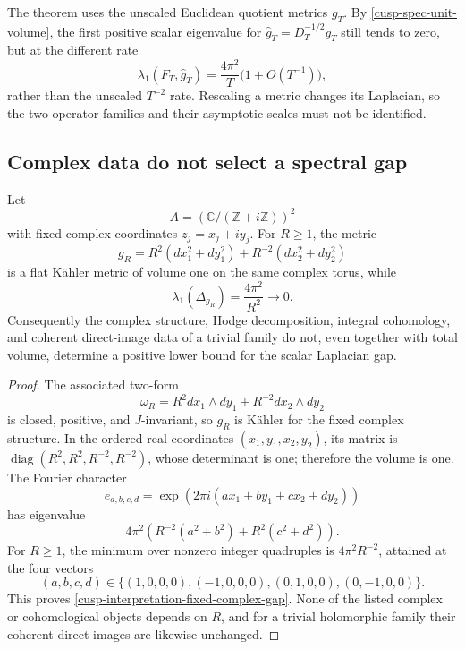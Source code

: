 \begin{remark}
The theorem uses the unscaled Euclidean quotient metrics \(g_T\).  By
\cref{cusp-spec-unit-volume}, the first positive scalar eigenvalue for
\(\widehat g_T=D_T^{-1/2}g_T\) still tends to zero, but at the different
rate
\[
 \lambda_1(F_T,\widehat g_T)
 =\frac{4\pi^2}{T}\bigl(1+O(T^{-1})\bigr),
\]
rather than the unscaled \(T^{-2}\) rate.  Rescaling a metric changes its
Laplacian, so the two operator families and their asymptotic scales must not
be identified.
\end{remark}

\subsection{Complex data do not select a spectral gap}
\label{cusp-interpretation-metric-indeterminacy-subsection}

\begin{proposition}
\label{cusp-interpretation-fixed-complex-counterexample}
Let
\[
 A=(\mathbb C/(\mathbb Z+i\mathbb Z))^2
\]
with fixed complex coordinates
\(z_j=x_j+iy_j\).  For \(R\ge1\), the metric
\begin{equation}
 g_R=R^2(dx_1^2+dy_1^2)+R^{-2}(dx_2^2+dy_2^2)
 \label{cusp-interpretation-fixed-complex-metric}
\end{equation}
is a flat K\"ahler metric of volume one on the same complex torus, while
\begin{equation}
 \lambda_1(\Delta_{g_R})=\frac{4\pi^2}{R^2}\longrightarrow0.
 \label{cusp-interpretation-fixed-complex-gap}
\end{equation}
Consequently the complex structure, Hodge decomposition, integral
cohomology, and coherent direct-image data of a trivial family do not, even
together with total volume, determine a positive lower bound for the scalar
Laplacian gap.
\end{proposition}

\begin{proof}
The associated two-form
\[
 \omega_R=R^2dx_1\wedge dy_1+R^{-2}dx_2\wedge dy_2
\]
is closed, positive, and \(J\)-invariant, so \(g_R\) is K\"ahler for the fixed
complex structure.  In the ordered real coordinates
\((x_1,y_1,x_2,y_2)\), its matrix is
\(\operatorname{diag}(R^2,R^2,R^{-2},R^{-2})\), whose determinant is one;
therefore the volume is one.  The Fourier character
\[
 e_{a,b,c,d}
 =\exp(2\pi i(ax_1+by_1+cx_2+dy_2))
\]
has eigenvalue
\[
 4\pi^2\left(R^{-2}(a^2+b^2)+R^2(c^2+d^2)\right).
\]
For \(R\ge1\), the minimum over nonzero integer quadruples is
\(4\pi^2R^{-2}\), attained at the four vectors
\[
 (a,b,c,d)\in
 \{(1,0,0,0),(-1,0,0,0),(0,1,0,0),(0,-1,0,0)\}.
\]
This proves
\cref{cusp-interpretation-fixed-complex-gap}.  None of the listed complex or
cohomological objects depends on \(R\), and for a trivial holomorphic family
their coherent direct images are likewise unchanged.
\end{proof}

